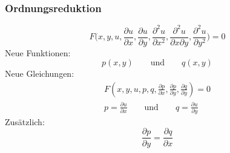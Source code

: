 \begin{frame}
\frametitle{Ordnungsreduktion}
\[
F\biggl(x,y,u,
\frac{\partial u}{\partial x},
\frac{\partial u}{\partial y},
\frac{\partial^2 u}{\partial x^2},
\frac{\partial^2 u}{\partial x\partial y},
\frac{\partial^2 u}{\partial y^2}
\biggr)=0
\]
\pause
Neue Funktionen:
\[
p(x,y)\qquad\text{und}\qquad q(x,y)
\]
\pause
Neue Gleichungen:
\begin{gather*}
F(x,y,u,p,q,\frac{\partial p}{\partial x},\frac{\partial p}{\partial y},
\frac{\partial q}{\partial y})=0
\\
p=\frac{\partial u}{\partial x}\qquad\text{und}\qquad
q=\frac{\partial u}{\partial y}
\end{gather*}
\pause
Zusätzlich:
\[
\frac{\partial p}{\partial y}=\frac{\partial q}{\partial x}
\]
\end{frame}


